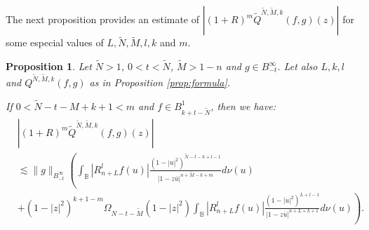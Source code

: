 \documentclass[12pt,twoside,leqno,final]{amsart}
\theoremstyle{plain}
\newtheorem{prop}[thm]{Proposition}
\begin{document}
The next proposition provides an estimate of $|(1+R)^m \tilde Q^{\tilde N,\tilde M,k}(f,g)(z)|$ for some especial values of $L,\tilde N,\tilde M,l,k$ and $m$.

\begin{prop} \label{prop:estQ}
Let $\tilde N>1$, $0<t<\tilde N$, $\tilde M>1-n$ and $g\in B^\infty_{-t}$.   
Let also $L,k,l$ and $Q^{\tilde N,\tilde M,k}(f,g)$ as in Proposition \ref{prop:formula}. 

If $0< \tilde N-t-M+k+1<m$ and $f\in B^1_{k+t-\tilde N}$, then  we have: 
\begin{align*}
&|(1+R)^m \tilde Q^{\tilde N,\tilde M,k}(f,g)(z)|\\
&\lesssim \|g\|_{B^\infty_{-t}}\left(\int_{{\mathbb B}} |R^l_{n+L} f(u)|
\frac{(1-|u|^2)^{\tilde N-t-k+l-1}}{|1-z\overline u|^{n+\tilde M-k+m}} d\nu(u)\right.\\
&\left.+(1-|z|^2)^{k+1-m}\Omega_{N-t-\tilde M}(1-|z|^2)
\int_{{\mathbb B}} |R^l_{n+L} f(u)|\frac{(1-|u|^2)^{L+l-1}}{|1-z\overline u|^{n+L+k+1}}d\nu(u)\right).
\end{align*}
\end{prop}
\end{document}
